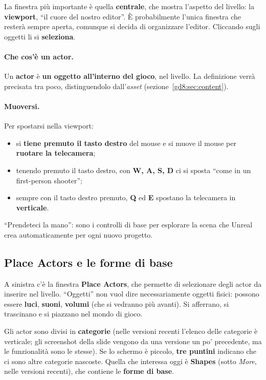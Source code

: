 La finestra più importante è quella \textbf{centrale}, che mostra l'aspetto
del livello: la \textbf{viewport}, ``il cuore del nostro editor''. È
probabilmente l'unica finestra che resterà sempre aperta, comunque si decida di
organizzare l'editor. Cliccando sugli oggetti li si \textbf{seleziona}.

\paragraph{Che cos'è un actor.} Un \textbf{actor} è \textbf{un oggetto
all'interno del gioco}, nel livello. La definizione verrà precisata tra poco,
distinguendolo dall'\emph{asset} (sezione~\ref{gd8:sec:content}).

\paragraph{Muoversi.} Per spostarsi nella viewport:
\begin{itemize}
  \item si \textbf{tiene premuto il tasto destro} del mouse e si muove il
        mouse per \textbf{ruotare la telecamera};
  \item tenendo premuto il tasto destro, con \textbf{W, A, S, D} ci si sposta
        ``come in un first-person shooter'';
  \item sempre con il tasto destro premuto, \textbf{Q} ed \textbf{E} spostano
        la telecamera in \textbf{verticale}.
\end{itemize}
``Prendeteci la mano'': sono i controlli di base per esplorare la scena che
Unreal crea automaticamente per ogni nuovo progetto.

\subsection{Place Actors e le forme di base}

A sinistra c'è la finestra \textbf{Place Actors}, che permette di selezionare
degli actor da inserire nel livello. ``Oggetti'' non vuol dire necessariamente
oggetti fisici: possono essere \textbf{luci}, \textbf{suoni},
\textbf{volumi} (che si vedranno più avanti). Si afferrano, si trascinano e si
piazzano nel mondo di gioco.

Gli actor sono divisi in \textbf{categorie} (nelle versioni recenti l'elenco
delle categorie è verticale; gli screenshot della slide vengono da una
versione un po' precedente, ma le funzionalità sono le stesse). Se lo schermo è
piccolo, \textbf{tre puntini} indicano che ci sono altre categorie nascoste.
Quella che interessa oggi è \textbf{Shapes} (sotto \emph{More}, nelle versioni
recenti), che contiene le \textbf{forme di base}.

